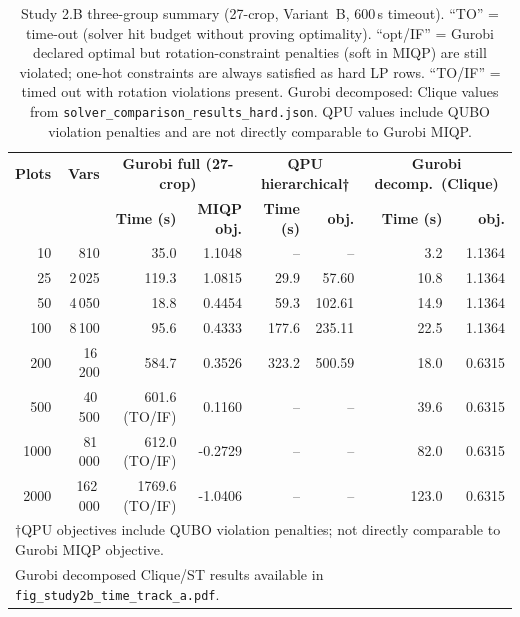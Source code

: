 \documentclass{oqireport}
\begin{document}
\begin{table}[H]
\centering
\caption{Study 2.B three-group summary (27-crop, Variant~B, 600\,s timeout).
  ``TO'' = time-out (solver hit budget without proving optimality).
  ``opt/IF'' = Gurobi declared optimal but rotation-constraint penalties (soft in MIQP) are still violated;
  one-hot constraints are always satisfied as hard LP rows.
  ``TO/IF'' = timed out with rotation violations present.
  Gurobi decomposed: Clique values from \texttt{solver\_comparison\_results\_hard.json}.
  QPU values include QUBO violation penalties and are not directly comparable to Gurobi MIQP.}
\label{tab:study2b_three_group}
\small
\begin{tabular}{rrrrrrrr}
\toprule
\textbf{Plots} & \textbf{Vars} &
\multicolumn{2}{c}{\textbf{Gurobi full (27-crop)}} &
\multicolumn{2}{c}{\textbf{QPU hierarchical†}} &
\multicolumn{2}{c}{\textbf{Gurobi decomp.\ (Clique)}} \\
& & \textbf{Time (s)} & \textbf{MIQP obj.} &
    \textbf{Time (s)} & \textbf{obj.} &
    \textbf{Time (s)} & \textbf{obj.} \\
\midrule
    10 &     810 &   35.0         &  1.1048 &   --  &   --   &  3.2 & 1.1364 \\
    25 &  2\,025 &  119.3         &  1.0815 &  29.9 &  57.60 & 10.8 & 1.1364 \\
    50 &  4\,050 &   18.8         &  0.4454 &  59.3 & 102.61 & 14.9 & 1.1364 \\
 100 &  8\,100 &   95.6         &  0.4333 & 177.6 & 235.11 & 22.5 & 1.1364 \\
 200 & 16\,200 &  584.7         &  0.3526 & 323.2 & 500.59 & 18.0 & 0.6315 \\
 500 & 40\,500 &  601.6 (TO/IF) &  0.1160 &  --   &   --   & 39.6 & 0.6315 \\
1000 & 81\,000 &  612.0 (TO/IF) & -0.2729 &  --   &   --   & 82.0 & 0.6315 \\
2000 & 162\,000 & 1769.6 (TO/IF) & -1.0406 &  --  &   --   & 123.0 & 0.6315 \\
\bottomrule
\multicolumn{8}{l}{\footnotesize †QPU objectives include QUBO violation penalties; not directly comparable to Gurobi MIQP objective.} \\
\multicolumn{8}{l}{\footnotesize Gurobi decomposed Clique/ST results available in \texttt{fig\_study2b\_time\_track\_a.pdf}.} \\
\end{tabular}
\end{table}
\end{document}
